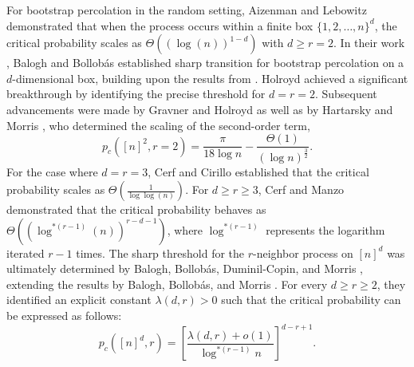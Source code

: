 \documentclass[reqno,11pt]{amsart}
\renewcommand{\geq}{\geqslant}
\begin{document}
For bootstrap percolation in the random setting, Aizenman and Lebowitz \cite{Aizenman_1988} demonstrated that when the process occurs within a finite box $\{1, 2, \ldots, n\}^d$, the critical probability scales as ${\Theta}((\log(n))^{1-d})$ with $d \geq r=2$. In their work \cite{BALOGH2003305}, Balogh and Bollob{\'a}s established sharp transition for bootstrap percolation on a $d$-dimensional box, building upon the results from \cite{Friedgut}. Holroyd \cite{Holroyd2002SharpMT} achieved a significant breakthrough by identifying the precise threshold for $d=r=2$. Subsequent advancements were made by Gravner and Holroyd \cite{holroyd_2008} as well as by Hartarsky and Morris \cite{Robert}, who determined the scaling of the second-order term,
    $$p_c([n]^2,r=2)=\frac{\pi}{18 \log n }-\frac{\Theta(1)}{(\log n)^{\frac{3}{2}}}.$$
   For the case where $d=r=3$, Cerf and Cirillo \cite{Cirillo} established that the critical probability scales as ${\Theta} \left(\frac{1}{\log \log(n)} \right)$. For $d \geq r \geq 3$, Cerf and Manzo \cite{CERF200269} demonstrated that the critical probability behaves as  ${\Theta}\left((\log^{*(r-1)}(n))^{r-d-1} \right)$, where $\log^{*(r-1)}$ represents the logarithm iterated $r-1$ times. The sharp threshold for the $r$-neighbor process on $[n]^d$ was ultimately determined by Balogh, Bollob{\'a}s, Duminil-Copin, and Morris \cite{Balogh}, extending the results by Balogh, Bollob{\'a}s, and Morris \cite{Balogh2}. For every $d \geq r \geq 2$, they identified an explicit constant $\lambda(d,r) > 0$ such that the critical probability can be expressed as follows: 
   $$
   p_c([n]^d,r)=\left[ \frac{\lambda(d,r)+o(1)}{\log^{*(r-1)} n} \right]^{d-r+1}.$$
\end{document}
